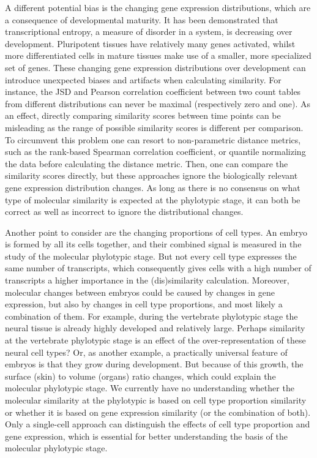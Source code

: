 A different potential bias is the changing gene expression distributions, which are a consequence of developmental maturity. It has been demonstrated that transcriptional entropy, a measure of disorder in a system, is decreasing over development\cite{Kannan2021}. Pluripotent tissues have relatively many genes activated, whilst more differentiated cells in mature tissues make use of a smaller, more specialized set of genes. These changing gene expression distributions over development can introduce unexpected biases and artifacts when calculating similarity. For instance, the JSD and Pearson correlation coefficient between two count tables from different distributions can never be maximal (respectively zero and one). As an effect, directly comparing similarity scores between time points can be misleading as the range of possible similarity scores is different per comparison. To circumvent this problem one can resort to non-parametric distance metrics, such as the rank-based Spearman correlation coefficient\cite{Irie2011}, or quantile normalizing the data before calculating the distance metric\cite{marletaz2018}. Then, one can compare the similarity scores directly, but these approaches ignore the biologically relevant gene expression distribution changes. As long as there is no consensus on what type of molecular similarity is expected at the phylotypic stage, it can both be correct as well as incorrect to ignore the distributional changes. 

Another point to consider are the changing proportions of cell types. An embryo is formed by all its cells together, and their combined signal is measured in the study of the molecular phylotypic stage. But not every cell type expresses the same number of transcripts\cite{Kim2023, Percharde2017}, which consequently gives cells with a high number of transcripts a higher importance in the (dis)similarity calculation. Moreover, molecular changes between embryos could be caused by changes in gene expression, but also by changes in cell type proportions, and most likely a combination of them. For example, during the vertebrate phylotypic stage the neural tissue is already highly developed and relatively large. Perhaps similarity at the vertebrate phylotypic stage is an effect of the over-representation of these neural cell types? Or, as another example, a practically universal feature of embryos is that they grow during development. But because of this growth, the surface (skin) to volume (organs) ratio changes, which could explain the molecular phylotypic stage. We currently have no understanding whether the molecular similarity at the phylotypic is based on cell type proportion similarity or whether it is based on gene expression similarity (or the combination of both). Only a single-cell approach can distinguish the effects of cell type proportion and gene expression, which is essential for better understanding the basis of the molecular phylotypic stage.

